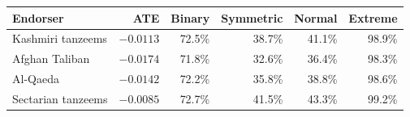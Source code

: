 \begin{tabular}{lrrrrr}
\toprule
Endorser & ATE & Binary & Symmetric & Normal & Extreme \\
\midrule
Kashmiri tanzeems & $-0.0113$ & 72.5\% & 38.7\% & 41.1\% & 98.9\% \\
Afghan Taliban & $-0.0174$ & 71.8\% & 32.6\% & 36.4\% & 98.3\% \\
Al-Qaeda & $-0.0142$ & 72.2\% & 35.8\% & 38.8\% & 98.6\% \\
Sectarian tanzeems & $-0.0085$ & 72.7\% & 41.5\% & 43.3\% & 99.2\% \\
\bottomrule
\end{tabular}
